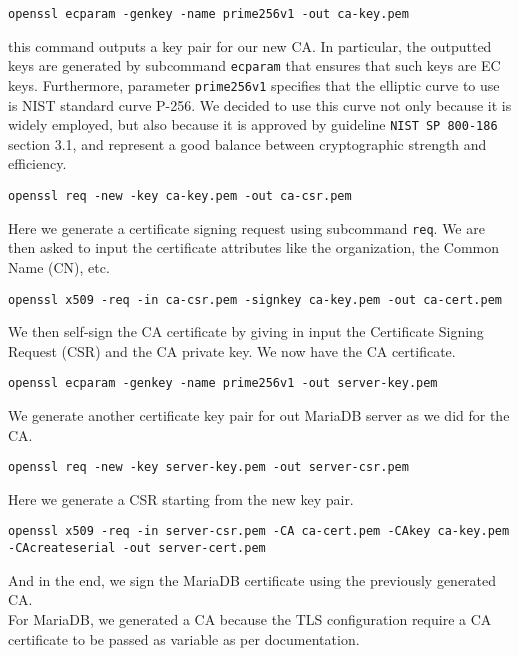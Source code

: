 \begin{center}
    \texttt{openssl ecparam -genkey -name prime256v1 -out ca-key.pem}
\end{center}

this command outputs a key pair for our new CA. In particular, the outputted keys are generated by subcommand \texttt{ecparam} that ensures that such keys are EC keys. Furthermore, parameter \texttt{prime256v1} specifies that the elliptic curve to use is NIST standard curve P-256. We decided to use this curve not only because it is widely employed, but also because it is approved by guideline \texttt{NIST SP 800-186} section 3.1, and represent a good balance between cryptographic strength and efficiency\cite{article:NistRecCurves}.

\begin{center}
    \texttt{openssl req -new -key ca-key.pem -out ca-csr.pem}
\end{center}

Here we generate a certificate signing request using subcommand \texttt{req}. We are then asked to input the certificate attributes like the organization, the Common Name (CN), etc.

\begin{center}
    \texttt{openssl x509 -req -in ca-csr.pem -signkey ca-key.pem -out ca-cert.pem}
\end{center}

We then self-sign the CA certificate by giving in input the Certificate Signing Request (CSR) and the CA private key. We now have the CA certificate.

\begin{center}
    \texttt{openssl ecparam -genkey -name prime256v1 -out server-key.pem}
\end{center}

We generate another certificate key pair for out MariaDB server as we did for the CA.

\begin{center}
    \texttt{openssl req -new -key server-key.pem -out server-csr.pem}
\end{center}

Here we generate a CSR starting from the new key pair.

\begin{center}
    \texttt{openssl x509 -req -in server-csr.pem -CA ca-cert.pem -CAkey ca-key.pem -CAcreateserial -out server-cert.pem}
\end{center}

And in the end, we sign the MariaDB certificate using the previously generated CA.\\For MariaDB, we generated a CA because the TLS configuration require a CA certificate to be passed as variable as per documentation.

